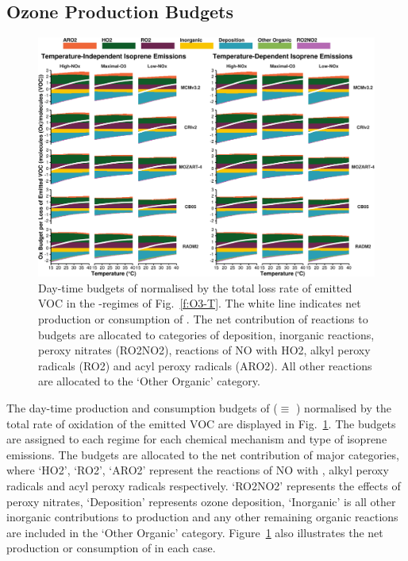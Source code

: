 \subsection{Ozone Production Budgets} \label{ss:r_budgets}
\begin{figure}[t]%
    \centering%
    \caption{Day-time budgets of  normalised by the total loss rate of emitted VOC in the -regimes of Fig.~\ref{f:O3-T}. The white line indicates net production or consumption of . The net contribution of reactions to  budgets are allocated to categories of deposition, inorganic reactions, peroxy nitrates (RO2NO2), reactions of NO with HO2, alkyl peroxy radicals (RO2) and acyl peroxy radicals (ARO2). All other reactions are allocated to the `Other Organic' category.}%
    \label{f:ozone_budgets}%
    \includegraphics[width = \textwidth]{img/Ox_budgets}%
    \vspace{-4mm}
\end{figure}
% 
The day-time production and consumption budgets of  ($\equiv$ ) normalised by the total rate of oxidation of the emitted VOC are displayed in Fig.~\ref{f:ozone_budgets}.
The  budgets are assigned to each  regime for each chemical mechanism and type of isoprene emissions.
The budgets are allocated to the net contribution of major categories, where `HO2', `RO2', `ARO2' represent the reactions of NO with , alkyl peroxy radicals and acyl peroxy radicals respectively.
`RO2NO2' represents the effects of peroxy nitrates, `Deposition' represents ozone deposition, `Inorganic' is all other inorganic contributions to  production and any other remaining organic reactions are included in the `Other Organic' category.
Figure~\ref{f:ozone_budgets} also illustrates the net production or consumption of  in each case.


